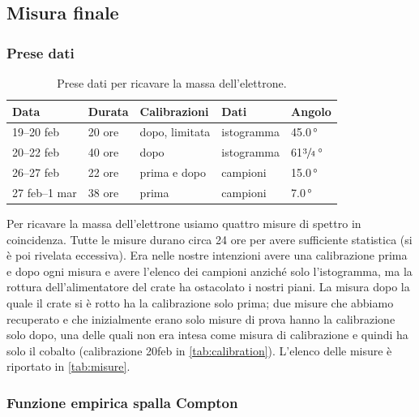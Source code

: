 \subsection{Misura finale}

\subsubsection{Prese dati}

\begin{table}
	\centering
	\begin{tabular}{lllll}
		Data & Durata & Calibrazioni & Dati & Angolo \\
		\hline
		19--20 feb    & 20 ore & dopo, limitata & istogramma &           45.0\,\si{\degree} \\
		20--22 feb    & 40 ore & dopo           & istogramma &   61$\sfrac34$\,\si{\degree} \\
		26--27 feb    & 22 ore & prima e dopo   & campioni   &           15.0\,\si{\degree} \\
		27 feb--1 mar & 38 ore & prima          & campioni   & \phantom{1}7.0\,\si{\degree}   
	\end{tabular}
	\caption{\label{tab:misure}
	Prese dati per ricavare la massa dell'elettrone.}
\end{table}

Per ricavare la massa dell'elettrone usiamo quattro misure di spettro in coincidenza.
Tutte le misure durano circa 24 ore per avere sufficiente statistica (si è poi rivelata eccessiva).
Era nelle nostre intenzioni avere una calibrazione prima e dopo ogni misura
e avere l'elenco dei campioni anziché solo l'istogramma,
ma la rottura dell'alimentatore del crate ha ostacolato i nostri piani.
La misura dopo la quale il crate si è rotto ha la calibrazione solo prima;
due misure che abbiamo recuperato e che inizialmente erano solo misure di prova hanno la calibrazione solo dopo,
una delle quali non era intesa come misura di calibrazione e quindi ha solo il cobalto
(calibrazione 20feb in \autoref{tab:calibration}).
L'elenco delle misure è riportato in \autoref{tab:misure}.

\subsubsection{Funzione empirica spalla Compton}

